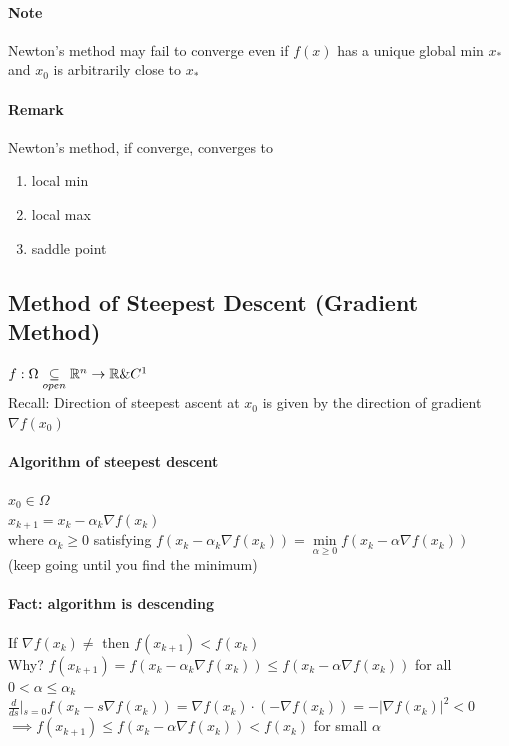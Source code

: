 \documentclass[11pt]{article}
\begin{document}
\paragraph{Note}
Newton's method may fail to converge even if $f(x)$ has a unique global min $x_*$ and $x_0$ is arbitrarily close to $x_*$
\paragraph{Remark}
Newton's method, if converge, converges to
\begin{enumerate}
	\item local min
	\item local max
	\item saddle point
\end{enumerate}

\subsection{Method of Steepest Descent (Gradient Method)}
$f: \Omega \underset{open}{\subseteq} \mathbb{R}^n \rightarrow \mathbb{R} \& C^1$ \\
Recall: Direction of steepest ascent at $x_0$ is given by the direction of gradient $\nabla f(x_0)$
\paragraph{Algorithm of steepest descent}
$x_0 \in \Omega$ \\
$x_{k+1} = x_k - \alpha_k \nabla f(x_k)$\\
where $\alpha_k \geq 0$ satisfying $f(x_k - \alpha_k \nabla f(x_k)) = \underset{\alpha \geq 0}{\min} f(x_k - \alpha \nabla f(x_k))$ \\

(keep going until you find the minimum) \\
\paragraph{Fact: algorithm is descending}
If $\nabla f(x_k) \neq$ then $f(x_{k+1}) < f(x_k)$\\
Why? $f(x_{k+1}) = f(x_k - \alpha_k \nabla f(x_k)) \leq f(x_k - \alpha \nabla f(x_k))$ for all 
$ 0 < \alpha \leq \alpha_k$ \\
 $\frac{d}{ds}|_{s=0} f(x_k - s\nabla f(x_k)) = \nabla f(x_k) \cdot (-\nabla f(x_k)) = - |\nabla f(x_k)|^2 < 0$ \\
$\implies f(x_{k+1}) \leq f(x_k - \alpha \nabla f(x_k)) < f(x_k)$ for small $\alpha$
\end{document}
